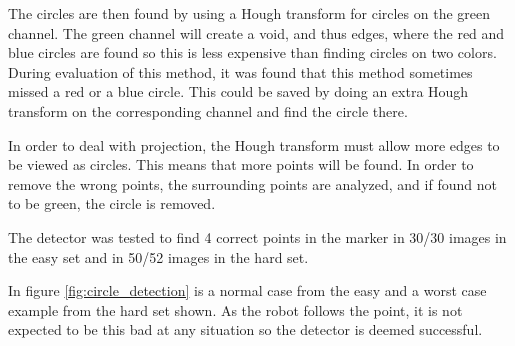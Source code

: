 The circles are then found by using a Hough transform for circles on the green channel.
The green channel will create a void, and thus edges, where the red and blue circles are found so this is less expensive than finding circles on two colors.
During evaluation of this method, it was found that this method sometimes missed a red or a blue circle.
This could be saved by doing an extra Hough transform on the corresponding channel and find the circle there.

In order to deal with projection, the Hough transform must allow more edges to be viewed as circles.
This means that more points will be found.
In order to remove the wrong points, the surrounding points are analyzed, and if found not to be green, the circle is removed.

The detector was tested to find 4 correct points in the marker in 30/30 images in the easy set and in 50/52 images in the hard set.

In figure \ref{fig:circle_detection} is a normal case from the easy and a worst case example from the hard set shown.
As the robot follows the point, it is not expected to be this bad at any situation so the detector is deemed successful.

